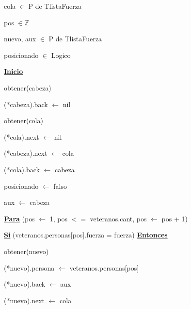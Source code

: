 \documentclass{article}
\begin{document}
            \hspace{12mm}cola $\in$ P de TlistaFuerza

            \hspace{12mm}pos $\in \mathbb{Z}$

            \hspace{12mm}nuevo, aux $\in$ P de TlistaFuerza

            \hspace{12mm}posicionado $\in$ Logico

        \hspace{8mm}\underline{\textbf{Inicio}}

            \hspace{12mm}obtener(cabeza)

            \hspace{12mm}(*cabeza).back $\leftarrow$ nil

            \hspace{12mm}obtener(cola)

            \hspace{12mm}(*cola).next $\leftarrow$ nil

            \hspace{12mm}(*cabeza).next $\leftarrow$ cola

            \hspace{12mm}(*cola).back $\leftarrow$ cabeza

            \hspace{12mm}posicionado $\leftarrow$ falso

            \hspace{12mm}aux $\leftarrow$ cabeza

            \hspace{12mm}\underline{\textbf{Para}} (pos $\leftarrow$ 1, pos $<=$ veteranos.cant, pos $\leftarrow$ pos + 1)

                \hspace{16mm}\underline{\textbf{Si}} (veteranos.personas[pos].fuerza = fuerza) \underline{\textbf{Entonces}}

                    \hspace{20mm}obtener(nuevo)

                    \hspace{20mm}(*nuevo).persona $\leftarrow$ veteranos.personas[pos]

                    \hspace{20mm}(*nuevo).back $\leftarrow$ aux

                    \hspace{20mm}(*nuevo).next $\leftarrow$ cola
\end{document}
